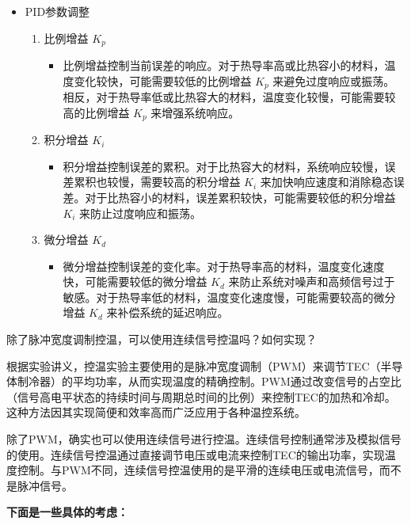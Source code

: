 \documentclass[dvipsnames, svgnames,a4paper,11pt]{article}
\begin{document}
\begin{itemize}
		\item PID参数调整
		
		\begin{enumerate}
			\item 比例增益 \( K_p \)
			\begin{itemize}
				\item 比例增益控制当前误差的响应。对于热导率高或比热容小的材料，温度变化较快，可能需要较低的比例增益 \( K_p \) 来避免过度响应或振荡。相反，对于热导率低或比热容大的材料，温度变化较慢，可能需要较高的比例增益 \( K_p \) 来增强系统响应。
			\end{itemize}
			
			\item 积分增益 \( K_i \)
			\begin{itemize}
				\item 积分增益控制误差的累积。对于比热容大的材料，系统响应较慢，误差累积也较慢，需要较高的积分增益 \( K_i \) 来加快响应速度和消除稳态误差。对于比热容小的材料，误差累积较快，可能需要较低的积分增益 \( K_i \) 来防止过度响应和振荡。
			\end{itemize}
			
			\item 微分增益 \( K_d \)
			\begin{itemize}
				\item 微分增益控制误差的变化率。对于热导率高的材料，温度变化速度快，可能需要较低的微分增益 \( K_d \) 来防止系统对噪声和高频信号过于敏感。对于热导率低的材料，温度变化速度慢，可能需要较高的微分增益 \( K_d \) 来补偿系统的延迟响应。
			\end{itemize}
		\end{enumerate}
	\end{itemize}
	
	
	\begin{question}
		除了脉冲宽度调制控温，可以使用连续信号控温吗？如何实现？
	\end{question}
	
	根据实验讲义，控温实验主要使用的是脉冲宽度调制（PWM）来调节TEC（半导体制冷器）的平均功率，从而实现温度的精确控制。PWM通过改变信号的占空比（信号高电平状态的持续时间与周期总时间的比例）来控制TEC的加热和冷却。这种方法因其实现简便和效率高而广泛应用于各种温控系统。
	
	除了PWM，确实也可以使用连续信号进行控温。连续信号控制通常涉及模拟信号的使用。连续信号控温通过直接调节电压或电流来控制TEC的输出功率，实现温度控制。与PWM不同，连续信号控温使用的是平滑的连续电压或电流信号，而不是脉冲信号。
	
	\textbf{下面是一些具体的考虑：}
	
\end{document}
